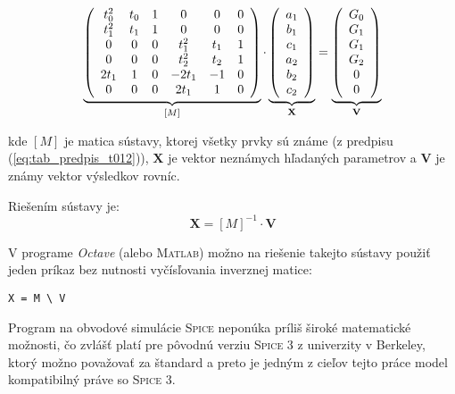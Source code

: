 \begin{equation}
	\underbrace
	{
		\left( 
		\begin{array}{c c c c c c}
			t_0^2& t_0& 1& 0& 0& 0\\
			t_1^2 &t_1 &1 &0 & 0& 0 \\
			0& 0& 0& t_1^2& t_1& 1 \\
			0& 0& 0& t_2^2& t_2& 1 \\
			2t_1& 1& 0& -2t_1& -1& 0 \\
			0& 0& 0& 2t_1& 1& 0
		\end{array}
		\right)
	}_{[M]}
	\cdot
	\underbrace
	{
		\left(
		\begin{array}{c}
			a_1 \\
			b_1 \\
			c_1 \\
			a_2 \\
			b_2 \\
			c_2
		\end{array}
		\right)
	}_{\mathbf{X}}
	=
	\underbrace
	{
		\left( 
		\begin{array}{c}
			G_0 \\
			G_1 \\
			G_1 \\
			G_2 \\
			0 \\
			0
		\end{array}
		\right)
	}_{\mathbf{V}}
	\label{eq:krivka_matica_sustavy}
\end{equation}

kde $[M]$ je matica sústavy, ktorej všetky prvky sú známe (z predpisu (\ref{eq:tab_predpis_t012})), $\mathbf{X}$ je vektor neznámych hľadaných parametrov a $\mathbf{V}$ je známy vektor výsledkov rovníc.

Riešením sústavy je:
\begin{equation}
	\mathbf{X} = [M]^{-1} \cdot \mathbf{V}
	\label{eq:krivka_riesenie_abc}
\end{equation}

V programe \textit{Octave} (alebo \textsc{Matlab}) možno na riešenie takejto sústavy použiť jeden príkaz bez nutnosti vyčísľovania inverznej matice:
\begin{verbatim}
X = M \ V
\end{verbatim}

Program na obvodové simulácie \textsc{Spice} neponúka príliš široké matematické možnosti, čo zvlášť platí pre pôvodnú verziu \textsc{Spice 3} z univerzity v Berkeley, ktorý možno považovať za štandard a preto je jedným z cieľov tejto práce model kompatibilný práve so \textsc{Spice 3}.


